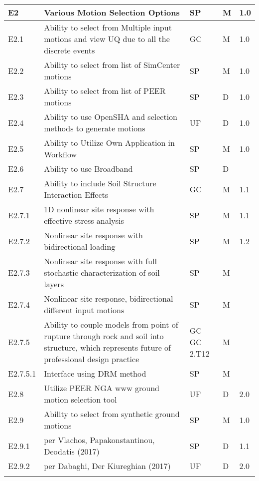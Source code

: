 \begin{longtable}{| p{} | p{} | p{} | p{} |  p{} |}
      E2 & \textbf{Various Motion Selection Options} & SP & M & 1.0  \\ \hline
      E2.1 & Ability to select from Multiple input motions and view UQ due to all the discrete events & GC & M & 1.0  \\ \hline
      E2.2 & Ability to select from list of SimCenter motions & SP & M & 1.0 \\ \hline
      E2.3 & Ability to select from list of PEER motions & SP & D & 1.0 \\ \hline
      E2.4 & Ability to use OpenSHA and selection methods to generate motions & UF & D & 1.0 \\ \hline
      E2.5 & Ability to Utilize Own Application in Workflow & SP & M & 1.0 \\ \hline
      E2.6 & Ability to use Broadband & SP & D &  \\ \hline
      E2.7  & Ability to include Soil Structure Interaction Effects & GC & M & 1.1 \\  \hline
      E2.7.1  & 1D nonlinear site response with effective stress analysis & SP & M & 1.1  \\ \hline
      E2.7.2  & Nonlinear site response with bidirectional loading & SP & M & 1.2 \\  \hline
      E2.7.3  & Nonlinear site response with full stochastic characterization of soil layers & SP & M &  \\ \hline
      E2.7.4 & Nonlinear site response, bidirectional different input motions  & SP & M &  \\  \hline
      E2.7.5 & Ability to couple models from point of rupture through rock and soil into structure, which represents future of professional design practice & GC GC 2.T12 & M &  \\  \hline
      E2.7.5.1 & Interface using DRM method  & SP  & M &  \\  \hline
      E2.8 & Utilize PEER NGA www ground motion selection tool  & UF & D & 2.0 \\ \hline
      E2.9 & Ability to select from synthetic ground motions & SP & M & 1.0  \\
      E2.9.1 & per Vlachos, Papakonstantinou, Deodatis (2017) & SP & D & 1.1  \\ 
      E2.9.2 & per Dabaghi, Der Kiureghian (2017) & UF & D & 2.0 \\  \hhline{=====}
      

\end{longtable}
